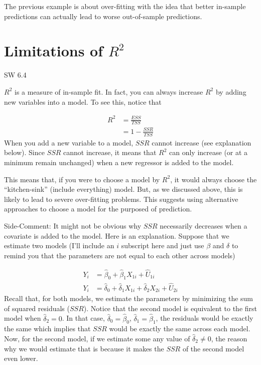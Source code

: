 \documentclass[
  letterpaper,
  DIV=11,
  numbers=noendperiod]{scrreprt}
\begin{document}
The previous example is about over-fitting with the idea that better
in-sample predictions can actually lead to worse out-of-sample
predictions.

\section{\texorpdfstring{Limitations of
\(R^2\)}{Limitations of R\^{}2}}\label{limitations-of-r2}

SW 6.4

\(R^2\) is a measure of in-sample fit. In fact, you can always increase
\(R^2\) by adding new variables into a model. To see this, notice that

\[
  \begin{aligned}
    R^2 &= \frac{ESS}{TSS} \\
    &= 1 - \frac{SSR}{TSS}
  \end{aligned}
\] When you add a new variable to a model, \(SSR\) cannot increase (see
explanation below). Since \(SSR\) cannot increase, it means that \(R^2\)
can only increase (or at a minimum remain unchanged) when a new
regressor is added to the model.

This means that, if you were to choose a model by \(R^2\), it would
always choose the ``kitchen-sink'' (include everything) model. But, as
we discussed above, this is likely to lead to severe over-fitting
problems. This suggests using alternative approaches to choose a model
for the purposed of prediction.

{Side-Comment:} It might not be obvious why \(SSR\) necessarily
decreases when a covariate is added to the model. Here is an
explanation. Suppose that we estimate two models (I'll include an \(i\)
subscript here and just use \(\beta\) and \(\delta\) to remind you that
the parameters are not equal to each other across models)

\[
  \begin{aligned}
  Y_i &= \hat{\beta}_0 + \hat{\beta}_1 X_{1i} + \hat{U}_{1i} \\
  Y_i &= \hat{\delta}_0 + \hat{\delta}_1 X_{1i} + \hat{\delta}_2 X_{2i} + \hat{U}_{2i}
  \end{aligned}
\] Recall that, for both models, we estimate the parameters by
minimizing the sum of squared residuals (\(SSR\)). Notice that the
second model is equivalent to the first model when \(\hat{\delta}_2=0\).
In that case, \(\hat{\delta}_0 = \hat{\beta}_0\),
\(\hat{\delta}_1 = \hat{\beta}_1\), the residuals would be exactly the
same which implies that \(SSR\) would be exactly the same across each
model. Now, for the second model, if we estimate some any value of
\(\hat{\delta}_2 \neq 0\), the reason why we would estimate that is
because it makes the \(SSR\) of the second model even lower.
\end{document}
